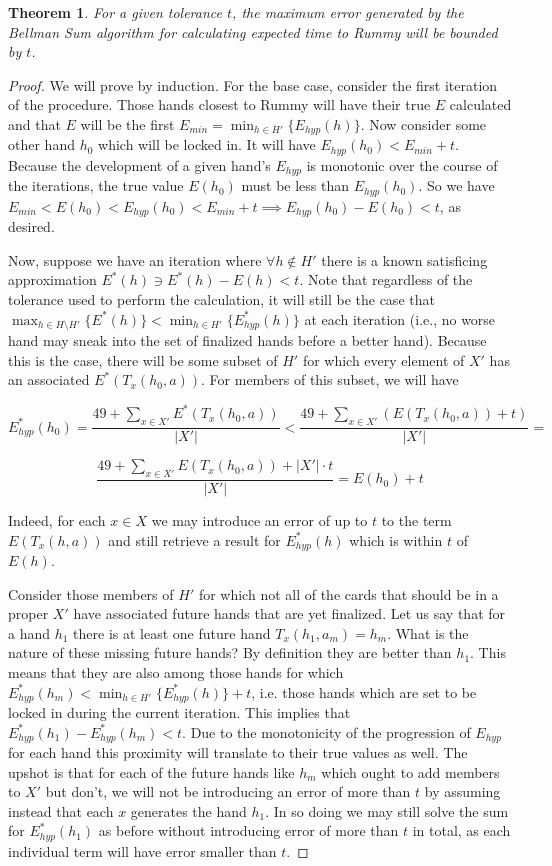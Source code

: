 \documentclass[letter,12pt]{article}
\newtheorem{theorem}{Theorem}
\begin{document}
\begin{theorem}
For a given tolerance $t$, the maximum error generated by the Bellman Sum algorithm for calculating expected time to Rummy will be bounded by $t$.
\end{theorem}

\begin{proof}
We will prove by induction. For the base case, consider the first iteration of the procedure. Those hands closest to Rummy will have their true $E$ calculated and that $E$ will be the first $E_{min} = \min_{h \in H'} \{E_{hyp}(h)\}$. Now consider some other hand $h_0$ which will be locked in. It will have $E_{hyp}(h_0) < E_{min} + t$. Because the development of a given hand's $E_{hyp}$ is monotonic over the course of the iterations, the true value $E(h_0)$ must be less than $E_{hyp}(h_0)$. So we have $E_{min} < E(h_0) < E_{hyp}(h_0) < E_{min} + t \implies E_{hyp}(h_0) - E(h_0) < t$, as desired.

Now, suppose we have an iteration where $\forall h \notin H'$ there is a known satisficing approximation $E^*(h) \ni E^*(h) - E(h) < t$. Note that regardless of the tolerance used to perform the calculation, it will still be the case that $\max_{h \in H\setminus H'}\{E^*(h)\} < \min_{h \in H'}\{E_{hyp}^*(h)\}$ at each iteration (i.e., no worse hand may sneak into the set of finalized hands before a better hand). Because this is the case, there will be some subset of $H'$ for which every element of $X'$ has an associated $E^*(T_x(h_0,a))$. For members of this subset, we will have

$$E_{hyp}^*(h_0) = \frac{49+\sum_{x\in X'} E^*(T_x(h_0,a))}{|X'|} <  \frac{49+\sum_{x\in X'} (E(T_x(h_0,a))+t)}{|X'|} = $$

$$\frac{49+\sum_{x\in X'} E(T_x(h_0,a))+|X'| \cdot t}{|X'|} = E(h_0) + t$$

Indeed, for each $x \in X$ we may introduce an error of up to $t$ to the term $E(T_x(h,a))$ and still retrieve a result for $E_{hyp}^*(h)$ which is within $t$ of $E(h)$.

Consider those members of $H'$ for which not all of the cards that should be in a proper $X'$ have associated future hands that are yet finalized. Let us say that for a hand $h_1$ there is at least one future hand $T_x(h_1,a_m) = h_m$. What is the nature of these missing future hands? By definition they are better than $h_1$. This means that they are also among those hands for which $E_{hyp}^*(h_m) < \min_{h \in H'}\{E_{hyp}^*(h)\}+t$, i.e. those hands which are set to be locked in during the current iteration. This implies that $E_{hyp}^*(h_1)-E_{hyp}^*(h_m) < t$. Due to the monotonicity of the progression of $E_{hyp}$ for each hand this proximity will translate to their true values as well. The upshot is that for each of the future hands like $h_m$ which ought to add members to $X'$ but don't, we will not be introducing an error of more than $t$ by assuming instead that each $x$ generates the hand $h_1$. In so doing we may still solve the sum for $E_{hyp}^*(h_1)$ as before without introducing error of more than $t$ in total, as each individual term will have error smaller than $t$.


\end{proof}
\end{document}
